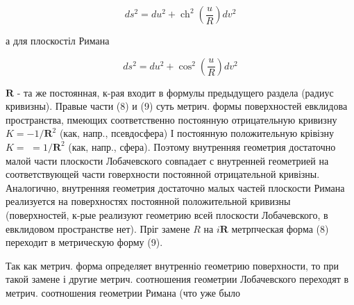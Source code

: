\documentclass[10pt]{article}
\begin{document}
\[

d s^{2}=d u^{2}+\operatorname{ch}^{2}\left(\frac{u}{R}\right) d v^{2}

\]



а для плоскостіл Римана



\[

d s^{2}=d u^{2}+\cos ^{2}\left(\frac{u}{R}\right) d v^{2}

\]



$\boldsymbol{R}$ - та же постоянная, к-рая входит в формулы предыдущего раздела (радиус кривизны). Правые части (8) и (9) суть метрич. формы поверхностей евклидова пространства, пмеющих соответственно постоянную отрицательную кривизну $K=-1 / \boldsymbol{R}^{2}$ (как, напр., псевдосфера) І постоянную положительную крівізну $K=$ $=1 / \boldsymbol{R}^{2}$ (как, напр., сфера). Поэтому внутренняя геометрия достаточно малой части плоскости Лобачевского совпадает с внутренней геометрией на соответствующей части говерхности постоянной отрицательной кривізны. Аналогично, внутренняя геометрия достаточно малых частей плоскости Римана реализуется на поверхностях постоянной положительной кривизны (поверхностей, к-рые реализуют геометрию всей плоскости Лобачевского, в евклидовом пространстве нет). Пріг замене $R$ на $i \boldsymbol{R}$ метрпческая форма (8) переходит в метрическую форму (9).



Так как метрич. форма определяет внутренніо геометрию поверхности, то при такой замене і другие метрич. соотношения геометрии Лобачевского переходят в метрич. соотношения геометрии Римана (что уже было
\end{document}
